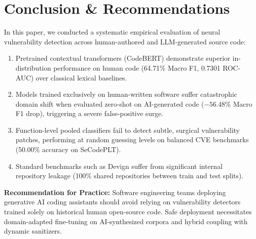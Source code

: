 \documentclass[conference]{IEEEtran}
\begin{document}
\section{Conclusion \& Recommendations}

In this paper, we conducted a systematic empirical evaluation of neural vulnerability detection across human-authored and LLM-generated source code:
\begin{enumerate}
    \item Pretrained contextual transformers (CodeBERT) demonstrate superior in-distribution performance on human code (64.71\% Macro F1, 0.7301 ROC-AUC) over classical lexical baselines.
    \item Models trained exclusively on human-written software suffer catastrophic domain shift when evaluated zero-shot on AI-generated code ($-56.48\%$ Macro F1 drop), triggering a severe false-positive surge.
    \item Function-level pooled classifiers fail to detect subtle, surgical vulnerability patches, performing at random guessing levels on balanced CVE benchmarks (50.00\% accuracy on SeCodePLT).
    \item Standard benchmarks such as Devign suffer from significant internal repository leakage (100\% shared repositories between train and test splits).
\end{enumerate}
\textbf{Recommendation for Practice:} Software engineering teams deploying generative AI coding assistants should avoid relying on vulnerability detectors trained solely on historical human open-source code. Safe deployment necessitates domain-adapted fine-tuning on AI-synthesized corpora and hybrid coupling with dynamic sanitizers.



\end{document}
